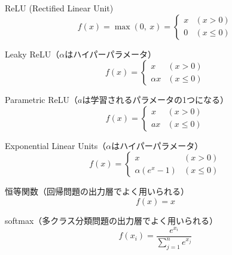 \documentclass[class=jsarticle, crop=false, dvipdfmx, fleqn]{standalone}
\begin{document}
ReLU (Rectified Linear Unit)
\begin{equation}
f(x) = \max(0,\ x) = 
	\begin{cases}
		x & (x > 0) \\
		0 & (x \leq 0)
	\end{cases}
\end{equation}

Leaky ReLU（$\alpha$はハイパーパラメータ）
\begin{equation}
f(x) = 
	\begin{cases}
		x & (x > 0) \\
		\alpha x & (x \leq 0)
	\end{cases}
\end{equation}

Parametric ReLU（$a$は学習されるパラメータの1つになる）
\begin{equation}
f(x) = 
	\begin{cases}
		x & (x > 0) \\
		a x & (x \leq 0)
	\end{cases}
\end{equation}

Exponential Linear Units（$\alpha$はハイパーパラメータ）
\begin{equation}
f(x) = 
	\begin{cases}
		x & (x > 0) \\
		\alpha (e^x - 1) & (x \leq 0)
	\end{cases}
\end{equation}

恒等関数（回帰問題の出力層でよく用いられる）
\begin{equation}
f(x) = x
\end{equation}

softmax（多クラス分類問題の出力層でよく用いられる）
\begin{equation}
f(x_i) = \frac{e^{x_i}}{\sum_{j=1}^{n} e^{x_j}}
\end{equation}
\end{document}
